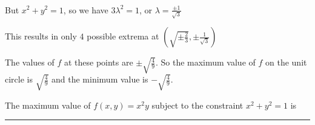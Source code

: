 \documentclass{ximera}
\begin{document}
\begin{question}
\begin{solution}
\begin{hint}
\begin{align*}
			\end{align*}
			But $x^2+y^2=1$, so we have $3\lambda^2 = 1$, or $\lambda =\frac{\pm 1}{\sqrt{3}}$
		\end{hint}
		\begin{hint}	
			This results in only $4$ possible extrema at $(\sqrt{\pm \frac{2}{3}}, \pm \frac{1}{\sqrt{3}})$
		\end{hint}
		\begin{hint}
			The values of $f$ at these points are $\pm \sqrt{\frac{4}{9}}$.  So the maximum value of $f$ on the unit circle 
			is $\sqrt{\frac{4}{9}}$ and the minimum value is $-\sqrt{\frac{4}{9}}$. 
		\end{hint}
		The maximum value of $f(x,y) = x^2y$ subject to the constraint $x^2+y^2=1$ is 
		\end{solution}
	\end{question}

	\hrule
\end{document}
